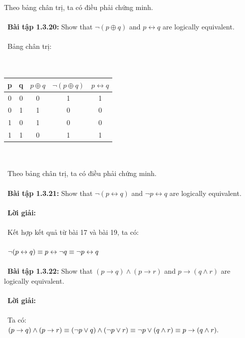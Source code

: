 \documentclass[a4paper]{article}
\begin{document}
Theo bảng chân trị, ta có điều phải chứng minh. \\\ \\\
\textbf{Bài tập 1.3.20: }Show that $\lnot(p \oplus q)$ and $p \leftrightarrow q$ are logically equivalent. \\\ \\\
Bảng chân trị: \\\ \\\
\begin{tabular}{|c|c|c|c|c|}
\hline 
p & q & $p \oplus q$ & $\lnot(p \oplus q)$ & $p \leftrightarrow q$ \\ 
\hline 
0 & 0 & 0 & 1 & 1 \\ 
\hline 
0 & 1 & 1 & 0 & 0 \\ 
\hline 
1 & 0 & 1 & 0 & 0 \\ 
\hline 
1 & 1 & 0 & 1 & 1 \\ 
\hline 
\end{tabular} \\\ \\\
Theo bảng chân trị, ta có điều phải chứng minh. \\\ \\\
\textbf{Bài tập 1.3.21: }Show that $\lnot(p \leftrightarrow q)$ and $\lnot p \leftrightarrow q$ are logically equivalent. \\\ \\\
\textbf{Lời giải: } \\\ \\\
Kết hợp kết quả từ bài 17 và bài 19, ta có: \\\ \\\
$\lnot (p \leftrightarrow q) \\\equiv p \leftrightarrow \lnot q \\\equiv \lnot p \leftrightarrow q$ \\\ \\\
\textbf{Bài tập 1.3.22: }Show that $(p \rightarrow q) \land (p \rightarrow r)$ and $p \rightarrow (q \land r)$ are logically equivalent. \\\ \\\
\textbf{Lời giải: } \\\ \\\
Ta có: \\\
$(p \rightarrow q) \land (p \rightarrow r) \\\equiv (\lnot p \lor q) \land (\lnot p \lor r) \\\equiv \lnot p \lor (q \land r) \\\equiv p \rightarrow (q \land r).$ \\\ \\\
\end{document}
